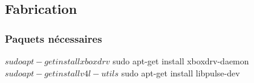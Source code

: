 \subsection*{Fabrication}




\subsubsection*{Paquets nécessaires}


\begin{DoxyCode}
$ sudo apt-get install xboxdrv
$ sudo apt-get install xboxdrv-daemon
$ sudo apt-get install v4l-utils
$ sudo apt-get install libpulse-dev
\end{DoxyCode}
 
